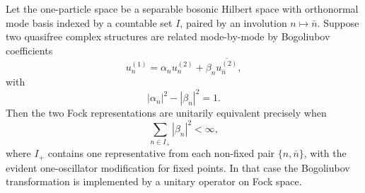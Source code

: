 \begin{theorem}
\label{qthm:shale-stinespring-diagonal}
Let the one-particle space be a separable bosonic Hilbert space with
orthonormal mode basis indexed by a countable set \(I\), paired by an
involution \(n\mapsto\bar n\).  Suppose two quasifree complex structures are
related mode-by-mode by Bogoliubov coefficients
\begin{equation}
  u_n^{(1)}
  =
  \alpha_n u_n^{(2)}
  +
  \beta_n\overline{u_{\bar n}^{(2)}},
  \label{eq:diagonal-bogoliubov-relation}
\end{equation}
with
\[
  |\alpha_n|^2-|\beta_n|^2=1 .
\]
Then the two Fock representations are unitarily equivalent precisely when
\begin{equation}
  \sum_{n\in I_+}|\beta_n|^2<\infty ,
  \label{eq:shale-stinespring-diagonal-condition}
\end{equation}
where \(I_+\) contains one representative from each non-fixed pair
\(\{n,\bar n\}\), with the evident one-oscillator modification for fixed
points.  In that case the Bogoliubov transformation is implemented by a
unitary operator on Fock space.
\end{theorem}

